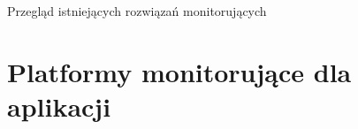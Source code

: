 \begin{chapter}{Przegląd istniejących rozwiązań monitorujących}
	\label{cha:existing_solutions}
	\newcommand{\chapterPath}{chapters/Existing_solutions}

	

	\section{Platformy monitorujące dla aplikacji} 
	
	
	
	
	
	
	
\end{chapter}

